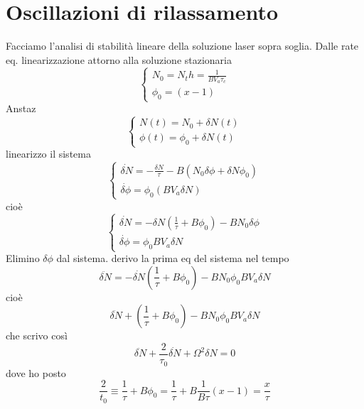 \section*{Oscillazioni di rilassamento}
Facciamo l'analisi di stabilità lineare della soluzione laser sopra soglia. Dalle rate eq. linearizzazione attorno alla soluzione stazionaria
\begin{equation*}
\begin{cases}
N_0 = N_th = \frac{1}{BV_a\tau_c}\\
\phi_0 = (x - 1)
\end{cases}
\end{equation*}
Anstaz
\begin{equation*}
\begin{cases}
N(t) = N_0 + \delta N(t)\\
\phi(t) = \phi_0 + \delta N(t)
\end{cases}
\end{equation*}
linearizzo il sistema
\begin{equation*}
\begin{cases}
\dot{\delta N} = -\frac{\delta N}{\tau} - B(N_0 \delta \phi + \delta N \phi_0)\\
\dot{\delta \phi} = \phi_0(BV_a \delta N)
\end{cases}
\end{equation*}
cioè
\begin{equation*}
\begin{cases}
\dot{\delta N} = -\delta N \left(\frac{1}{\tau} + B\phi_0\right) - BN_0 \delta \phi\\
\dot{\delta \phi} = \phi_0 BV_a \delta N
\end{cases}
\end{equation*}
Elimino $\delta\phi$ dal sistema. derivo la prima eq del sistema nel tempo
\begin{equation*}
\ddot{\delta N} = -\dot{\delta N} \left(\frac{1}{\tau} + B\phi_0\right) - BN_0\phi_0BV_a \delta N
\end{equation*}
cioè
\begin{equation*}
\ddot{\delta N} + \left(\frac{1}{\tau} + B\phi_0\right) - BN_0\phi_0BV_a \delta N
\end{equation*}
che scrivo così
\begin{equation*}
\ddot{\delta N} + \frac{2}{\tau_0} \dot{\delta N} + \Omega^2 \delta N = 0
\end{equation*}
dove ho posto
\begin{equation*}
\frac{2}{t_0} \equiv \frac{1}{\tau} + B\phi_0 = \frac{1}{\tau} + B\frac{1}{B\tau}(x-1)= \frac{x}{\tau}
\end{equation*}
